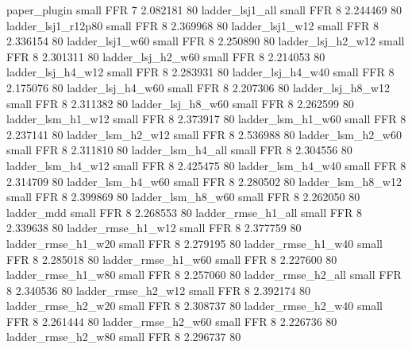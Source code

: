             paper_plugin      small      FFR                 7 2.082181 80
         ladder_lsj1_all      small      FFR                 8 2.244469 80
      ladder_lsj1_r12p80      small      FFR                 8 2.369968 80
         ladder_lsj1_w12      small      FFR                 8 2.336154 80
         ladder_lsj1_w60      small      FFR                 8 2.250890 80
       ladder_lsj_h2_w12      small      FFR                 8 2.301311 80
       ladder_lsj_h2_w60      small      FFR                 8 2.214053 80
       ladder_lsj_h4_w12      small      FFR                 8 2.283931 80
       ladder_lsj_h4_w40      small      FFR                 8 2.175076 80
       ladder_lsj_h4_w60      small      FFR                 8 2.207306 80
       ladder_lsj_h8_w12      small      FFR                 8 2.311382 80
       ladder_lsj_h8_w60      small      FFR                 8 2.262599 80
       ladder_lsm_h1_w12      small      FFR                 8 2.373917 80
       ladder_lsm_h1_w60      small      FFR                 8 2.237141 80
       ladder_lsm_h2_w12      small      FFR                 8 2.536988 80
       ladder_lsm_h2_w60      small      FFR                 8 2.311810 80
       ladder_lsm_h4_all      small      FFR                 8 2.304556 80
       ladder_lsm_h4_w12      small      FFR                 8 2.425475 80
       ladder_lsm_h4_w40      small      FFR                 8 2.314709 80
       ladder_lsm_h4_w60      small      FFR                 8 2.280502 80
       ladder_lsm_h8_w12      small      FFR                 8 2.399869 80
       ladder_lsm_h8_w60      small      FFR                 8 2.262050 80
              ladder_mdd      small      FFR                 8 2.268553 80
      ladder_rmse_h1_all      small      FFR                 8 2.339638 80
      ladder_rmse_h1_w12      small      FFR                 8 2.377759 80
      ladder_rmse_h1_w20      small      FFR                 8 2.279195 80
      ladder_rmse_h1_w40      small      FFR                 8 2.285018 80
      ladder_rmse_h1_w60      small      FFR                 8 2.227600 80
      ladder_rmse_h1_w80      small      FFR                 8 2.257060 80
      ladder_rmse_h2_all      small      FFR                 8 2.340536 80
      ladder_rmse_h2_w12      small      FFR                 8 2.392174 80
      ladder_rmse_h2_w20      small      FFR                 8 2.308737 80
      ladder_rmse_h2_w40      small      FFR                 8 2.261444 80
      ladder_rmse_h2_w60      small      FFR                 8 2.226736 80
      ladder_rmse_h2_w80      small      FFR                 8 2.296737 80
